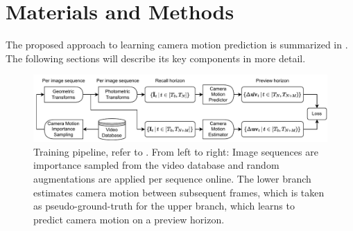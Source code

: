 








\section{Materials and Methods}
The proposed approach to learning camera motion prediction is summarized in . The following sections will describe its key components in more detail.

\begin{figure}
\centering
\includegraphics[width=\textwidth]{fig/23_02_13_miccai_figures.drawio.pdf}
\caption{Training pipeline, refer to  . From left to right: Image sequences are importance sampled from the video database and random augmentations are applied per sequence online. The lower branch estimates camera motion between subsequent frames, which is taken as pseudo-ground-truth for the upper branch, which learns to predict camera motion on a preview horizon.}
\label{c4:fig:training_pipeline}
\end{figure}


